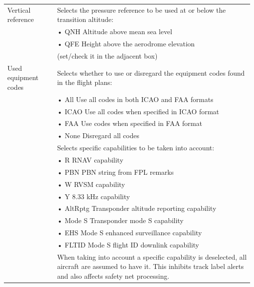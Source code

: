 \documentclass[a4paper,oneside,11pt]{memoir}
\begin{document}
\begin{longtable}{p{5cm} p{7.5cm}}
  Vertical reference      & Selects the pressure reference to be used at or below the transition altitude:\\      & \hspace{10pt}• QNH Altitude above mean sea level\\                          & \hspace{10pt}• QFE Height above the aerodrome elevation\\                                                 & (set/check it in the adjacent box)\\
  Used equipment codes    & Selects whether to use or disregard the equipment codes found in the flight plans:\\  & \hspace{10pt}• All Use all codes in both ICAO and FAA formats\\             & \hspace{10pt}• ICAO Use all codes when specified in ICAO format\\                                         & \hspace{10pt}• FAA Use codes when specified in FAA format\\                          & \hspace{10pt}• None Disregard all codes\\ & \hspace{10pt}Selects specific capabilities to be taken into account:\\ & \hspace{10pt}• R RNAV capability\\ & \hspace{10pt}• PBN PBN string from FPL remarks\\ & \hspace{10pt}• W RVSM capability\\ & \hspace{10pt}• Y 8.33 kHz capability\\ & \hspace{10pt}• AltRptg Transponder altitude reporting capability\\ & \hspace{10pt}• Mode S Transponder mode S capability\\ & \hspace{10pt}• EHS Mode S enhanced surveillance capability\\ & \hspace{10pt}• FLTID Mode S flight ID downlink capability\\ & When taking into account a specific capability is deselected, all aircraft are assumed to have it. This inhibits track label alerts and also affects safety net processing. \\

\end{longtable}
\end{document}
